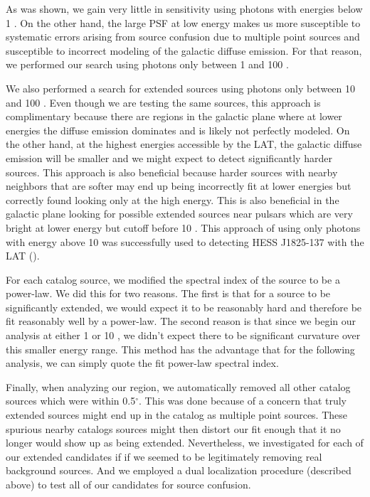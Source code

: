 \documentclass[12pt,preprint]{aastex}
\newcommand{\gev}{\text{GeV}\xspace}
\renewcommand{\deg}{\ensuremath{^\circ}\xspace}
\begin{document}
As was shown, we gain very little in sensitivity using photons with energies
below 1 \gev. On the other hand, the large PSF at low energy makes us
more susceptible to systematic errors arising from source confusion due
to multiple point sources and susceptible to incorrect modeling of the
galactic diffuse emission.  For that reason, we performed our search
using photons only between 1 \gev and 100 \gev.

We also performed a search for extended sources using photons only between
10 \gev and 100 \gev. Even though we are testing the same sources, this
approach is complimentary because there are regions in the galactic
plane where at lower energies the diffuse emission dominates and is
likely not perfectly modeled. On the other hand, at the highest energies
accessible by the LAT, the galactic diffuse emission will be smaller and
we might expect to detect significantly harder sources. This approach is
also beneficial because harder sources with nearby neighbors that are
softer may end up being incorrectly fit at lower energies but correctly
found looking only at the high energy.  This is also beneficial in the
galactic plane looking for possible extended sources near pulsars which
are very bright at lower energy but cutoff before 10 \gev.  This approach
of using only photons with energy above 10 \gev was successfully used
to detecting HESS J1825-137 with the LAT (\cite{fermi_hess_j1825}).

For each catalog source, we modified the spectral index of the source
to be a power-law. We did this for two reasons. The first is that for a
source to be significantly extended, we would expect it to be reasonably
hard and therefore be fit reasonably well by a power-law.  The second reason
is that since we begin our analysis at either 1 \gev or 10 \gev, we didn't
expect there to be significant curvature over this smaller energy range.
This method has the advantage that for the following analysis, we can
simply quote the fit power-law spectral index.

Finally, when analyzing our region, we automatically removed all other
catalog sources which were within 0.5\deg. This was done because of
a concern that truly extended sources might end up in the catalog as
multiple point sources. These spurious nearby catalogs sources might then
distort our fit enough that it no longer would show up as being extended.
Nevertheless, we investigated for each of our extended candidates if
if we seemed to be legitimately removing real background sources. And
we employed a dual localization procedure (described above) to test
all of our candidates for source confusion.
\end{document}
